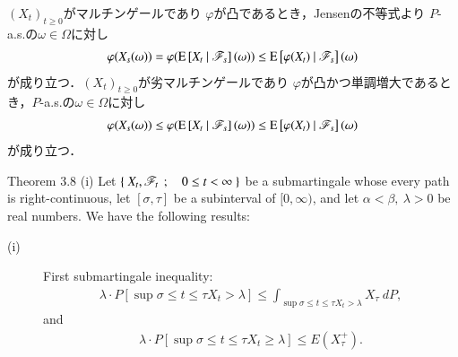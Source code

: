 	\begin{prf}
		$(X_t)_{t \geq 0}$がマルチンゲールであり
		$\varphi$が凸であるとき，Jensenの不等式より
		$P$-a.s.の$\omega \in \Omega$に対し
		\begin{align}
			\varphi(X_s(\omega))
			= \varphi(\operatorname{E} \left[ X_t \ \middle|\ \mathscr{F}_s \right](\omega))
			\leq \operatorname{E} \left[ \varphi(X_t) \ \middle|\ \mathscr{F}_s \right](\omega)
		\end{align}
		が成り立つ．$(X_t)_{t \geq 0}$が劣マルチンゲールであり
		$\varphi$が凸かつ単調増大であるとき，$P$-a.s.の$\omega \in \Omega$に対し
		\begin{align}
			\varphi(X_s(\omega))
			\leq \varphi(\operatorname{E} \left[ X_t \ \middle|\ \mathscr{F}_s \right](\omega))
			\leq \operatorname{E} \left[ \varphi(X_t) \ \middle|\ \mathscr{F}_s \right](\omega)
		\end{align}
		が成り立つ．
		\QED
	\end{prf}
	
	\begin{itembox}[l]{Theorem 3.8 (i)}
		Let $\left\{\ X_t,\mathscr{F}_t\ \, ; \quad 0 \leq t < \infty\ \right\}$ be a submartingale 
		whose every path is right-continuous, let $[\sigma, \tau]$ be a subinterval of 
		$[0,\infty)$, and let $\alpha < \beta,\ \lambda > 0$ be real numbers. We have the 
		following results:
		\begin{description}
			\item[(i)] First submartingale inequality:
				\begin{align}
					\lambda \cdot P\left[ \sup{\sigma \leq t \leq \tau}{X_t} > \lambda \right]
					\leq \int_{\displaystyle\sup{\sigma \leq t \leq \tau}{X_t} > \lambda} X_\tau\ dP,
					\label{eq:chapter_1_Theorem_3_8_i_1}
				\end{align}
				and
				\begin{align}
					\lambda \cdot P\left[ \sup{\sigma \leq t \leq \tau}{X_t} \geq \lambda \right]
					\leq E(X^+_\tau).
				\end{align}
		\end{description}
	\end{itembox}
	
